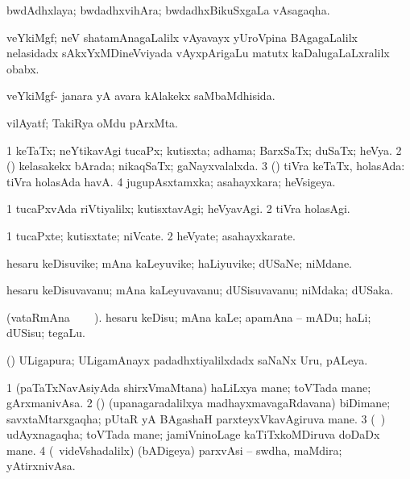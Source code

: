 \bentry
{} 
\gl{\nA}
\expl{}
\bmng
 bwdAdhxlaya; bwdadhxvihAra; bwdadhxBikuSxgaLa vAsagaqha. 
\emng
\eentry

\bentry
{} 
\gl{\nA}
\expl{}
\bmng
 veYkiMgf; neV shatamAnagaLalilx vAyavayx yUroVpina BAgagaLalilx nelasidadx sAkxYxMDineVviyada vAyxpArigaLu matutx kaDalugaLaLxralilx obabx. 
\emng
\eentry

\bentry
{} 
\gl{\gu}
\expl{}
\bmng
 veYkiMgf- janara yA avara kAlakekx saMbaMdhisida. 
\emng
\eentry

\bentry
{} 
\gl{\nA}
\expl{}
\bmng
 vilAyatf; TakiRya oMdu pArxMta. 
\emng
\eentry

\bentry
{} 
\gl{\gu}
\expl{}
\bmng
\bnum
\num{1} keTaTx; neYtikavAgi tucaPx; kutisxta; adhama; BarxSaTx; duSaTx; heVya. 
\num{2} (\pArxparx) kelasakekx bArada; nikaqSaTx; gaNayxvalalxda. 
\num{3} (\AmA) tiVra keTaTx, holasAda:  tiVra holasAda havA. 
\num{4} jugupAsxtamxka; asahayxkara; heVsigeya. 
\enum
\emng
\eentry

\bentry
{} 
\gl{\kirxvi}
\expl{}
\bmng
\bnum
\num{1} tucaPxvAda riVtiyalilx; kutisxtavAgi; heVyavAgi. 
\num{2} tiVra holasAgi. 
\enum
\emng
\eentry

\bentry
{} 
\gl{\nA}
\expl{}
\bmng
\bnum
\num{1} tucaPxte; kutisxtate; niVcate. 
\num{2} heVyate; asahayxkarate. 
\enum
\emng
\eentry

\bentry
{} 
\gl{\nA}
\expl{}
\bmng
 hesaru keDisuvike; mAna kaLeyuvike; haLiyuvike; dUSaNe; niMdane. 
\emng
\eentry

\bentry
{} 
\gl{\nA}
\expl{}
\bmng
 hesaru keDisuvavanu; mAna kaLeyuvavanu; dUSisuvavanu; niMdaka; dUSaka. 
\emng
\eentry

\bentry
{} 
\gl{\sakirx}(vataRmAna \parxpu\ \Eva\ 
\BUkaq\ ). \bmng
 hesaru keDisu; mAna kaLe; apamAna -- mADu; haLi; dUSisu; tegaLu. 
\emng
\eentry

\bentry
{} 
\gl{\nA}
\expl{}
\bmng
 (\ca) ULigapura; ULigamAnayx padadhxtiyalilxdadx saNaNx Uru, pALeya. 
\emng
\eentry

\bentry
{} 
\gl{\nA}
\expl{}
\bmng
\bnum
\num{1} (paTaTxNavAsiyAda shirxVmaMtana) haLiLxya mane; toVTada mane; gArxmanivAsa. 
\num{2} (\birx) (upanagaradalilxya madhayxmavagaRdavana) biDimane; savxtaMtarxgaqha; pUtaR yA BAgashaH parxteyxVkavAgiruva mane. 
\num{3} (\roV\ \pArxkatx) udAyxnagaqha; toVTada mane; jamiVninoLage kaTiTxkoMDiruva doDaDx mane. 
\num{4} (\kanmu\ videVshadalilx) (bADigeya) parxvAsi -- swdha, maMdira; yAtirxnivAsa. 
\enum
\emng
\eentry

